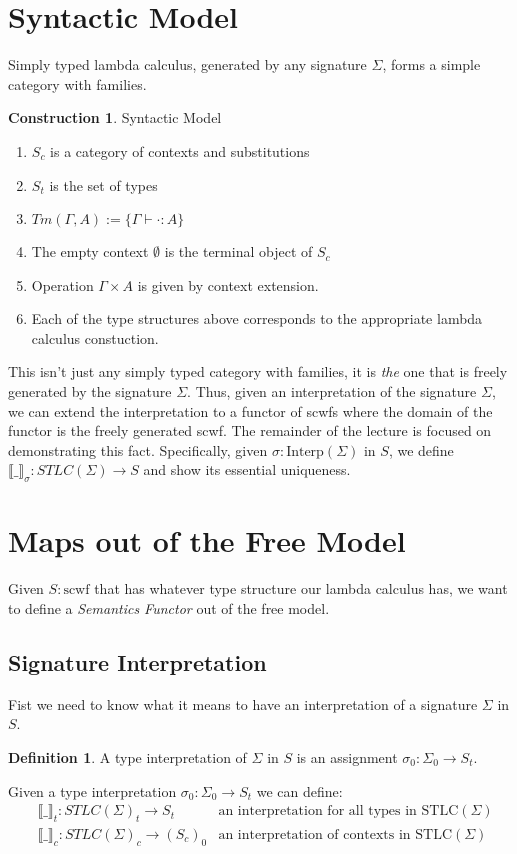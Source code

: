 \documentclass[12pt]{article}
\theoremstyle{definition}
\newtheorem{definition}{Definition}[section]
\newtheorem{construction}{Construction}[section]
\newcommand{\den}[1]{\llbracket #1 \rrbracket}
\begin{document}
\section{Syntactic Model}
Simply typed lambda calculus, generated by any signature $\Sigma$, forms a simple category with families.
\begin{construction} Syntactic Model
    \begin{enumerate}
        \item $S_c$ is a category of contexts and substitutions 
        \item $S_t$ is the set of types 
        \item $Tm(\Gamma,A) := \{\Gamma \vdash \cdot : A\}$
        \item The empty context $\emptyset$ is the terminal object of $S_c$
        \item Operation $\Gamma \times A$ is given by context extension.
        \item Each of the type structures above corresponds to the appropriate lambda calculus constuction.
    \end{enumerate}
\end{construction}
This isn't just any simply typed category with families, it is \textit{the} one that is freely generated by the signature $\Sigma$. Thus, given an interpretation of the signature $\Sigma$, we can extend the interpretation to a functor of scwfs where the domain of the functor is the freely generated scwf. The remainder of the lecture is focused on demonstrating this fact. Specifically, given $\sigma : \textrm{Interp}(\Sigma)$ in $S$, we define $\den{\_}_\sigma  : STLC(\Sigma) \to S$ and show its essential uniqueness. 

\section{Maps out of the Free Model}
Given $S : \textrm{scwf}$ that has whatever type structure our lambda calculus has, we want to define a \textit{Semantics Functor} out of the free model. 
\subsection{Signature Interpretation}
Fist we need to know what it means to have an interpretation of a signature $\Sigma$ in $S$. 
\begin{definition}
    A type interpretation of $\Sigma$ in $S$ is an assignment $\sigma_0 : \Sigma_0 \to S_t$.
\end{definition}
Given a type interpretation $\sigma_0 : \Sigma_0 \to S_t$ we can define: 
\begin{align*}
    & \den{\_}_t : STLC(\Sigma)_t \to S_t & \text{an interpretation for all types in STLC}(\Sigma)\\
    & \den{\_}_c : STLC(\Sigma)_c \to (S_c)_0 & \text{an interpretation of contexts in STLC}(\Sigma)
\end{align*}
\end{document}
